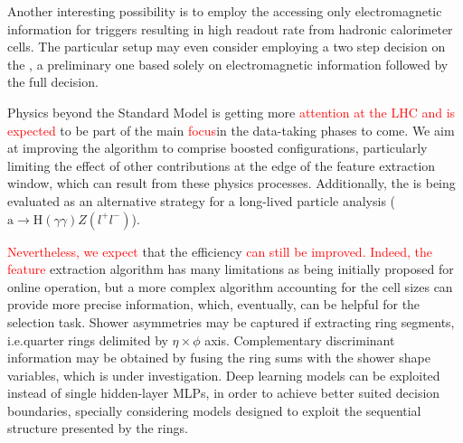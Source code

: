 
Another interesting possibility is to employ the \rnn{} accessing only
electromagnetic information for triggers resulting in high readout rate from
hadronic calorimeter cells. The particular setup may even consider employing a
two step decision on the \fastcalo{}, a preliminary one based solely on
electromagnetic information followed by the full \rnn{} decision.




Physics beyond the Standard Model is getting more \textcolor{red}{attention at the LHC  and is expected} to be part of the main \textcolor{red}{focus}in the data-taking phases to
come. We aim at improving the \rnn{} algorithm to comprise boosted
configurations, particularly limiting the effect of other contributions at
the edge of the feature extraction window, which can result from these physics
processes. Additionally, the \rnn{} is being evaluated as an alternative
strategy for a long-lived particle analysis
($\text{a}\rightarrow\text{H}(\gamma\gamma)Z(l^+l^-)$).

\textcolor{red}{Nevertheless, we expect}
that the \rnn{} efficiency \textcolor{red}{can still be improved. Indeed, the feature} extraction
algorithm has many limitations as being initially proposed for online
operation, but a more complex algorithm accounting for the cell sizes can
provide more precise information, which, eventually, can be helpful for the
selection task. Shower asymmetries may be captured if extracting ring segments,
i.e.\@ quarter rings delimited by $\eta\times\phi$ axis. Complementary
discriminant information may be obtained by fusing the ring sums with the shower shape variables,
which is under investigation. Deep learning models can be exploited instead of
single hidden-layer MLPs, in order to achieve better suited decision boundaries,
specially considering models designed to exploit the sequential structure
presented by the rings.


